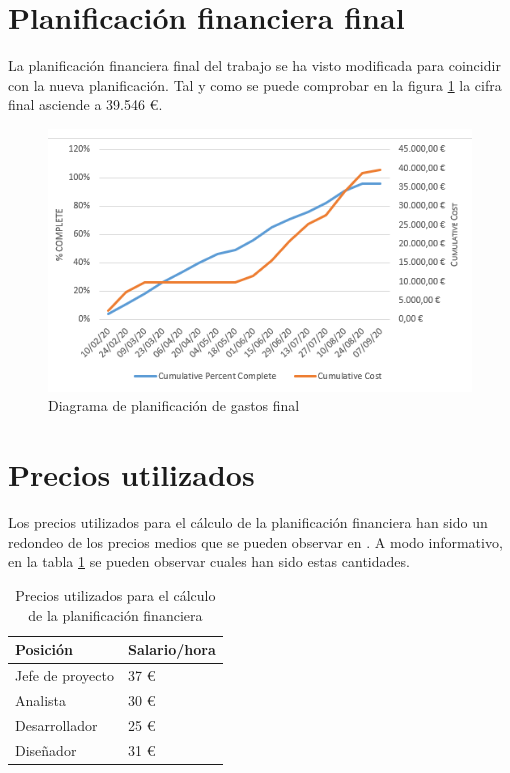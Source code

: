 \section{Planificación financiera final} \label{sec:planFinancieroFinal}
La planificación financiera final del trabajo se ha visto modificada para coincidir con la nueva planificación.
Tal y como se puede comprobar en la figura \ref{fig:gastosFinal} la cifra final asciende a 39.546 \euro. 
\begin{figure}[h!]
    \centering
    \includegraphics[width=0.7\linewidth]{img/Final/costes.PNG}
    \caption{Diagrama de planificación de gastos final}
    \label{fig:gastosFinal} 
\end{figure}



\section{Precios utilizados}
Los precios utilizados para el cálculo de la planificación financiera han sido un redondeo de los precios medios que se pueden observar en \cite{preciosInformatica}.
A modo informativo, en la tabla \ref{tab:precios} se pueden observar cuales han sido estas cantidades.

\begin{table}[h!]
    \centering
    \begin{tabular}{@{}ll@{}}
    \toprule
    Posición                                  & Salario/hora                         \\ \midrule
    Jefe de proyecto                          & 37 \euro                                 \\
    Analista                                  & 30 \euro                                  \\
    Desarrollador                             & 25 \euro                                  \\
    Diseñador                                 & 31 \euro                                  \\ \bottomrule
    \end{tabular}
    \caption{Precios utilizados para el cálculo de la planificación financiera}
    \label{tab:precios}
\end{table}




